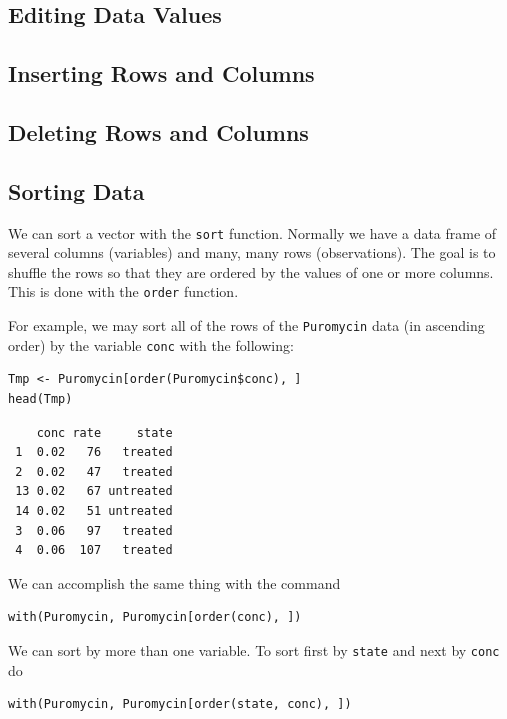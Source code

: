 \documentclass[captions=tableheading]{scrbook}
\begin{document}
\begin{example}
\subsection{Editing Data Values}
\label{sec-20-4-1}
\subsection{Inserting Rows and Columns}
\label{sec-20-4-2}
\subsection{Deleting Rows and Columns}
\label{sec-20-4-3}
\subsection{Sorting Data}
\label{sec-20-4-4}


We can sort a vector with the \texttt{sort} function. Normally we have a data frame of several columns (variables) and many, many rows (observations). The goal is to shuffle the rows so that they are ordered by the values of one or more columns. This is done with the \texttt{order} function. 

For example, we may sort all of the rows of the \texttt{Puromycin} data (in ascending order) by the variable \texttt{conc} with the following: 


\lstset{language=R}
\begin{lstlisting}
Tmp <- Puromycin[order(Puromycin$conc), ]
head(Tmp)
\end{lstlisting}

\begin{verbatim}
    conc rate     state
 1  0.02   76   treated
 2  0.02   47   treated
 13 0.02   67 untreated
 14 0.02   51 untreated
 3  0.06   97   treated
 4  0.06  107   treated
\end{verbatim}

We can accomplish the same thing with the command 


\lstset{language=R}
\begin{lstlisting}
with(Puromycin, Puromycin[order(conc), ])
\end{lstlisting}

We can sort by more than one variable. To sort first by \texttt{state} and next by \texttt{conc} do 


\lstset{language=R}
\begin{lstlisting}
with(Puromycin, Puromycin[order(state, conc), ])
\end{lstlisting}


\end{example}
\end{document}
